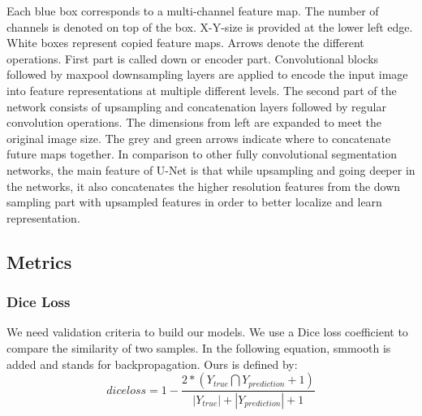 Each blue box corresponds to a multi-channel feature map. The number of channels is denoted on top of the box. X-Y-size is provided at the lower left edge. White boxes represent copied feature maps. Arrows denote the different operations.\newline
First part is called down or encoder part. Convolutional blocks followed by maxpool downsampling layers are applied to encode the input image into feature representations at multiple different levels. The second part of the network consists of upsampling and concatenation layers followed by regular convolution operations. The dimensions from left are expanded to meet the original image size. The grey and green arrows indicate where to concatenate future maps together.\newline
In comparison to other fully convolutional segmentation networks, the main feature of U-Net  is that while upsampling and going deeper in the networks, it also concatenates the higher resolution features from the down sampling part with upsampled features in order to better localize and learn representation.\newline

\subsection{Metrics}\label{metrics_chapter}

\subsubsection{Dice Loss}
We need  validation criteria to build our models. We use a Dice loss coefficient to compare the similarity of two samples. In the following equation, smmooth is added and stands for backpropagation. Ours is defined by: 
\begin{equation}
dice loss = 1 - \frac{2*(Y_{true} \bigcap Y_{prediction} + 1)}{|Y_{true}| + |Y_{prediction}| + 1}
\end{equation} 



